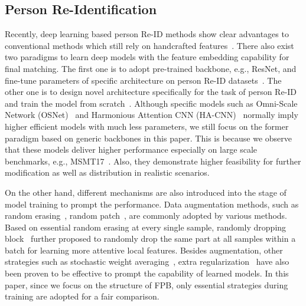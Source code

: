 \documentclass[journal]{IEEEtran}
\begin{document}
\subsection{Person Re-Identification}
Recently, deep learning based person Re-ID methods show clear advantages to conventional methods which still rely on handcrafted features~\cite{khamis2014joint,6247939}.
There also exist two paradigms to learn deep models with the feature embedding capability for final matching.
The first one is to adopt pre-trained backbone, e.g., ResNet, and fine-tune parameters of specific architecture on person Re-ID datasets~\cite{sun2018beyond,luo2019bag,yang2019CAMA,zheng2019pyramidal,chen2019ABD,9094042}.
The other one is to design novel architecture specifically for the task of person Re-ID and train the model from scratch~\cite{8578341,9011001,lawen2019attention,10.1007/978-3-030-60636-7_2}.
Although specific models such as Omni-Scale Network (OSNet)~\cite{9011001} and Harmonious Attention CNN (HA-CNN)~\cite{8578341} normally imply higher efficient models with much less parameters, we still focus on the former paradigm based on generic backbones in this paper.
This is because we observe that these models deliver higher performance especially on large scale benchmarks, e.g., MSMT17~\cite{8578114}.
Also, they demonstrate higher feasibility for further modification as well as distribution in realistic scenarios.

On the other hand, different mechanisms are also introduced into the stage of model training to prompt the performance.
Data augmentation methods, such as random erasing~\cite{zhong2020random}, random patch~\cite{9011001}, are commonly adopted by various methods.
Based on essential random erasing at every single sample, randomly dropping block~\cite{dai2019BDB, wu2020diversityachieving} further proposed to randomly drop the same part at all samples within a batch for learning more attentive local features.
Besides augmentation, other strategies such as stochastic weight averaging~\cite{izmailov2018averaging}, extra regularization~\cite{ni2020adaptive} have also been proven to be effective to prompt the capability of learned models.
In this paper, since we focus on the structure of FPB, only essential strategies during training are adopted for a fair comparison.
\end{document}
